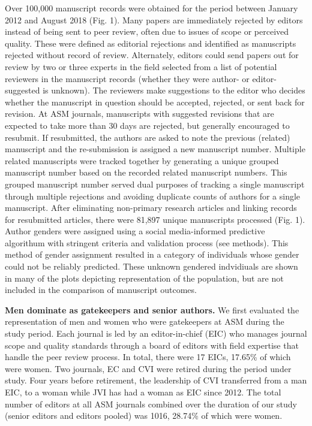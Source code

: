 \documentclass[11pt,]{article}
\begin{document}
Over 100,000 manuscript records were obtained for the period between
January 2012 and August 2018 (Fig. 1). Many papers are immediately
rejected by editors instead of being sent to peer review, often due to
issues of scope or perceived quality. These were defined as editorial
rejections and identified as manuscripts rejected without record of
review. Alternately, editors could send papers out for review by two or
three experts in the field selected from a list of potential reviewers
in the manuscript records (whether they were author- or editor-suggested
is unknown). The reviewers make suggestions to the editor who decides
whether the manuscript in question should be accepted, rejected, or sent
back for revision. At ASM journals, manuscripts with suggested revisions
that are expected to take more than 30 days are rejected, but generally
encouraged to resubmit. If resubmitted, the authors are asked to note
the previous (related) manuscript and the re-submission is assigned a
new manuscript number. Multiple related manuscripts were tracked
together by generating a unique grouped manuscript number based on the
recorded related manuscript numbers. This grouped manuscript number
served dual purposes of tracking a single manuscript through multiple
rejections and avoiding duplicate counts of authors for a single
manuscript. After eliminating non-primary research articles and linking
records for resubmitted articles, there were 81,897 unique manuscripts
processed (Fig. 1). Author genders were assigned using a social
media-informed predictive algorithum with stringent criteria and
validation process (see methods). This method of gender assignment
resulted in a category of individuals whose gender could not be reliably
predicted. These unknown gendered indvidiuals are shown in many of the
plots depicting representation of the population, but are not included
in the comparison of manuscript outcomes.

\textbf{Men dominate as gatekeepers and senior authors.} We first
evaluated the representation of men and women who were gatekeepers at
ASM during the study period. Each journal is led by an editor-in-chief
(EIC) who manages journal scope and quality standards through a board of
editors with field expertise that handle the peer review process. In
total, there were 17 EICs, 17.65\% of which were women. Two journals, EC
and CVI were retired during the period under study. Four years before
retirement, the leadership of CVI transferred from a man EIC, to a woman
while JVI has had a woman as EIC since 2012. The total number of editors
at all ASM journals combined over the duration of our study (senior
editors and editors pooled) was 1016, 28.74\% of which were women.
\end{document}
